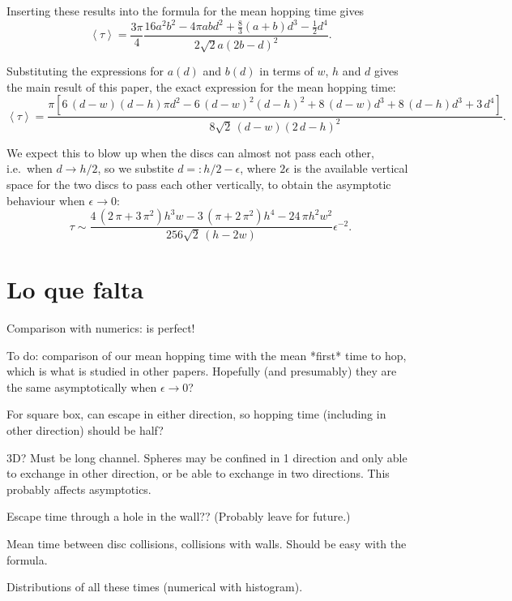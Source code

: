 \documentclass[a4paper,10pt]{article}
\newcommand{\mean}[1]{\left \langle #1 \right \rangle}
\begin{document}
Inserting these results into the formula for the mean hopping time gives
\begin{equation}
 \mean{\tau} = 	
\frac{3 \pi}{4}
\frac
{16 a^{2} b^{2}  - 4 \pi a b d^{2} + \textstyle \frac{8}{3} (a+b) d^{3}  - \frac{1}{2} d^{4}}
{ 2 \sqrt{2} a ( 2b - d )^2}.
\end{equation}

Substituting the expressions for $a(d)$ and $b(d)$ in terms of $w$, $h$ and $d$ gives
the main result of this paper, the exact expression for the mean hopping time:
\begin{equation}
 \mean{\tau} = 
\frac
{ \pi {\left[ 6\,{\left(d-w\right)}{\left(d-h\right)}\pi d^{2}-6 \, 
{\left(d-w\right)}^{2}{\left(d-h\right)}^{2}
+ 8 \, {\left(d-w\right)} d^{3}+8\,{\left(d-h\right)}d^{3}+3\,d^{4}\right]}
  }
{ 	
8 \sqrt{2} \,{\left(d-w\right)}{\left(2\,d-h\right)}^{2}  }.
\end{equation}

We expect this to blow up when the discs can almost not pass each other, i.e.\ when $d \to h/2$, so we 
substite $d =: h/2 - \epsilon$, where  $2 \epsilon$ is the available vertical space for the two discs to pass each other vertically,
to obtain the asymptotic behaviour when $\epsilon \to 0$:
\begin{equation}
\tau \sim \frac{4\,{\left(2\,\pi+3\,\pi^{2}\right)}h^{3}w - 3\,{\left(\pi+2\,\pi^{2}\right)}h^{4}-24\,\pi h^{2}w^{2}}
{256 \sqrt{2} \,{\left(h - 2 w \right)}}  \epsilon^{-2}.
\end{equation}


\section{Lo que falta}

Comparison with numerics: is perfect!

To do: comparison of our mean hopping time with the mean *first* time to hop, which is what is studied in other papers.
Hopefully (and presumably) they are the same asymptotically when $\epsilon \to 0$?

For square box, can escape in either direction, so hopping time (including in other direction) should be half?

3D?  Must be long channel. Spheres may be confined in 1 direction  and only able to exchange in other direction, or be able to exchange in two directions.
This probably affects asymptotics.

Escape time through a hole in the wall?? (Probably leave for future.)

Mean time between disc collisions, collisions with walls. Should be easy with the formula.

Distributions of all these times (numerical with histogram).
\end{document}
